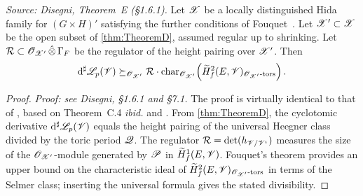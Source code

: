\begin{theorem}
  \label{thm:TheoremE}
  \textit{Source: Disegni, Theorem~E (§1.6.1).}
  Let $\mathscr{X}$ be a locally distinguished Hida family for $(G \times H)'$
  satisfying the further conditions of Fouquet~\cite[Theorem~B(iii)]{fouquet}.
  Let $\mathscr{X}' \subset \mathscr{X}$ be the open subset of \cref{thm:TheoremD},
  assumed regular up to shrinking.  Let
  $\mathcal{R} \subset \mathscr{O}_{\mathscr{X}'}\,\hat\otimes\,\Gamma_F$ be the regulator
  of the height pairing over $\mathscr{X}'$.  Then
  \[
    \mathrm{d}^\sharp\mathscr{L}_p(\mathscr{V})
    \succeq_{\mathscr{O}_{\mathscr{X}'}}
    \mathcal{R} \cdot
    \mathrm{char}_{\mathscr{O}_{\mathscr{X}'}}
    \!\left(\widetilde{H}^2_f(E,\mathscr{V})_{\mathscr{O}_{\mathscr{X}'}\text{-tors}}\right).
  \]
\end{theorem}

\begin{proof}
  \textit{Proof: see Disegni, §1.6.1 and §7.1.}
  The proof is virtually identical to that of \cite[Theorem~D]{dd-pyzz},
  based on Theorem~C.4 \emph{ibid.} and \cite[Theorem~B(ii)]{fouquet}.
  From \cref{thm:TheoremD}, the cyclotomic derivative
  $\mathrm{d}^\sharp\mathscr{L}_p(\mathscr{V})$ equals the height pairing of the universal Heegner
  class divided by the toric period $\mathscr{Q}$.  The regulator
  $\mathcal{R} = \det(h_{\mathscr{V}/\mathscr{V}^\iota})$ measures the size of the
  $\mathscr{O}_{\mathscr{X}'}$-module generated by $\mathscr{P}$ in
  $\widetilde{H}^1_f(E,\mathscr{V})$.  Fouquet's theorem \cite[Theorem~B(iii)]{fouquet}
  provides an upper bound on the characteristic ideal of
  $\widetilde{H}^2_f(E,\mathscr{V})_{\mathscr{O}_{\mathscr{X}'}\text{-tors}}$ in terms of the Selmer
  class; inserting the universal formula gives the stated divisibility.
\end{proof}

